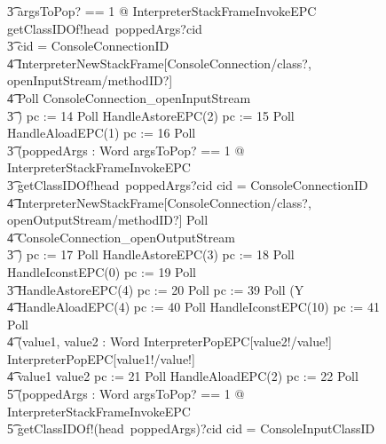 \begin{figure}[tp!]
{\begin{circus}
    \t3 \lschexpract \exists argsToPop? == 1 @ InterpreterStackFrameInvokeEPC \rschexpract \circseq getClassIDOf!head~poppedArgs?cid \then {} \\
    \t3 \circif cid = ConsoleConnectionID \circthen {} \\
    \t4 \lschexpract InterpreterNewStackFrame[ConsoleConnection/class?, openInputStream/methodID?] \rschexpract \circseq \\
    \t4 Poll \circseq ConsoleConnection\_openInputStream \\
    \t3 \circfi) \circseq pc := 14 \circseq Poll \circseq HandleAstoreEPC(2) \circseq pc := 15 \circseq Poll \circseq HandleAloadEPC(1) \circseq pc := 16 \circseq Poll \circseq \\
    \t3 (\circvar poppedArgs : Word \circspot \lschexpract \exists argsToPop? == 1 @ InterpreterStackFrameInvokeEPC \rschexpract \circseq \\
    \t3 getClassIDOf!head~poppedArgs?cid \then \circif cid = ConsoleConnectionID \circthen {} \\
    \t4 \lschexpract InterpreterNewStackFrame[ConsoleConnection/class?, openOutputStream/methodID?] \rschexpract \circseq Poll \circseq \\
    \t4 ConsoleConnection\_openOutputStream \\
    \t3 \circfi) \circseq pc := 17 \circseq Poll \circseq HandleAstoreEPC(3) \circseq pc := 18 \circseq Poll \circseq HandleIconstEPC(0) \circseq pc := 19 \circseq Poll \circseq \\
    \t3 HandleAstoreEPC(4) \circseq pc := 20 \circseq Poll \circseq pc := 39 \circseq Poll \circseq (\circmu Y \circspot \\
    \t4 HandleAloadEPC(4) \circseq pc := 40 \circseq Poll \circseq HandleIconstEPC(10) \circseq  pc := 41 \circseq Poll \circseq \\
    \t4 (\circvar value1, value2 : Word \circspot \lschexpract InterpreterPopEPC[value2!/value!] \rschexpract \circseq \lschexpract InterpreterPopEPC[value1!/value!] \rschexpract \circseq \\
    \t4 \circif value1 \leq value2 \circthen pc := 21 \circseq Poll \circseq HandleAloadEPC(2) \circseq pc := 22 \circseq Poll \circseq \\
    \t5 (\circvar poppedArgs : \seq Word \circspot \lschexpract \exists argsToPop?  == 1 @ InterpreterStackFrameInvokeEPC \rschexpract \circseq \\
    \t5 getClassIDOf!(head~poppedArgs)?cid \then \circif cid = ConsoleInputClassID \circthen {} \\

\end{circus}}
\end{figure}
